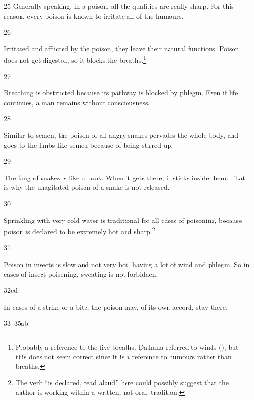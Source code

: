 \begin{translation}[resume]
\item [25] Generally speaking, in a poison, all the qualities are really sharp. 
For this reason, every poison is known to irritate all of the humours.

\item[26]

Irritated and afflicted by the poison, they leave their natural functions.
Poison does not get digested, so it blocks the breaths.\footnote{Probably a
    reference to the five breaths.  Ḍalhaṇa referred to winds (), but this
    does not seem correct since it is a reference to humours rather than breaths.}

\item[27] 

Breathing is obstructed because its pathway is blocked by phlegm. Even
if life continues, a man remains without consciousness.

\item [28]

Similar to semen, the poison of all angry snakes pervades the whole body, and goes 
to the limbs like semen because of being stirred up. 


\item [29]

The fang of snakes is like a hook.  When it gets there, it sticks inside them. That
is why the unagitated poison of a snake is not released.

\item [30] 

Sprinkling with very cold water is traditional for all cases of poisoning,
because poison is declared to be extremely hot and sharp.\footnote{The verb
     “is declared, read aloud” here could possibly suggest that the
    author is working within a written, not oral, tradition.}

\item [31]

Poison in insects is slow and not very hot, having a lot of wind and phlegm. 
So in cases of insect poisoning, sweating is not forbidden.

\item [32cd]

In cases of a strike or a bite, the poison may, of its own accord, stay there. 

\item[33--35ab]


\end{translation}
